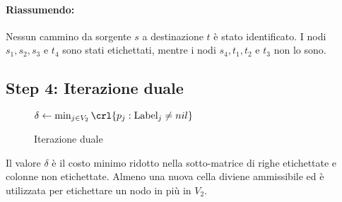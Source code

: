 \documentclass[\main/main.tex]{subfiles}
\begin{document}
\paragraph*{Riassumendo:}
Nessun cammino da sorgente \(s\) a destinazione \(t\) è stato identificato. I nodi \(s_1, s_2, s_3\) e \(t_4\) sono stati etichettati, mentre i nodi \(s_4, t_1, t_2\) e \(t_3\) non lo sono.

\clearpage
\subsection{Step 4: Iterazione duale}
\begin{figure}
	\begin{algorithm}[H]
		\SetAlgoLined
		\(\delta \leftarrow \min_{j \in V_2}\crl{p_j: \text{Label}_j \neq nil}\)\;
		\caption{Iterazione duale}
	\end{algorithm}
\end{figure}
Il valore \(\delta \) è il costo minimo ridotto nella sotto-matrice di righe etichettate e colonne non etichettate. Almeno una nuova cella diviene ammissibile ed è utilizzata per etichettare un nodo in più in \(V_2\).
\end{document}
